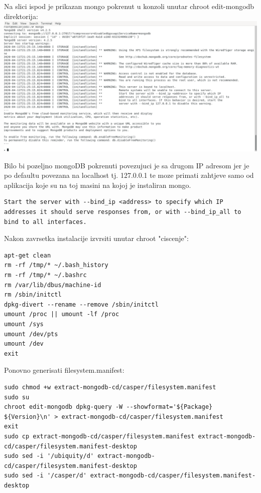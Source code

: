 \documentclass[12pt,vi]{mitthesis}
\begin{document}
Na slici ispod je prikazan mongo pokrenut u konzoli unutar chroot edit-mongodb direktorija:\\
\includegraphics[width=\linewidth]{images/mongoRunning.png}

Bilo bi pozeljno mongoDB pokrenuti povezujuci je sa drugom IP adresom jer je po defaultu povezana na localhost tj. 127.0.0.1 te moze primati zahtjeve samo od aplikacija koje su na toj masini na kojoj je instaliran mongo.
\begin{lstlisting}[style=BashInputStyle]
Start the server with --bind_ip <address> to specify which IP addresses it should serve responses from, or with --bind_ip_all to bind to all interfaces.
\end{lstlisting}
\noindent
Nakon zavrsetka instalacije izvrsiti unutar chroot "ciscenje":
\begin{lstlisting}[style=BashInputStyle]
apt-get clean
rm -rf /tmp/* ~/.bash_history
rm -rf /tmp/* ~/.bashrc
rm /var/lib/dbus/machine-id
rm /sbin/initctl
dpkg-divert --rename --remove /sbin/initctl
umount /proc || umount -lf /proc
umount /sys
umount /dev/pts
umount /dev
exit
\end{lstlisting}

\noindent
Ponovno generisati filesystem.manifest:
\begin{lstlisting}[style=BashInputStyle]
sudo chmod +w extract-mongodb-cd/casper/filesystem.manifest
sudo su
chroot edit-mongodb dpkg-query -W --showformat='${Package} ${Version}\n' > extract-mongodb-cd/casper/filesystem.manifest
exit
sudo cp extract-mongodb-cd/casper/filesystem.manifest extract-mongodb-cd/casper/filesystem.manifest-desktop
sudo sed -i '/ubiquity/d' extract-mongodb-cd/casper/filesystem.manifest-desktop
sudo sed -i '/casper/d' extract-mongodb-cd/casper/filesystem.manifest-desktop
\end{lstlisting}
\end{document}
